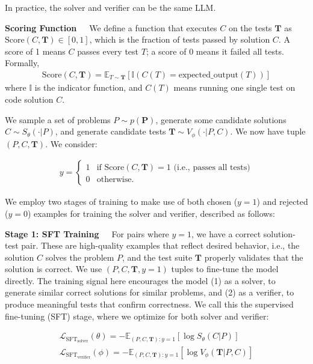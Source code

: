 In practice, the solver and verifier can be the same LLM.

\textbf{Scoring Function}\ \ \ We define a function that executes $C$ on the tests $\mathbf{T}$ as $\text{Score}(C, \mathbf{T}) \in [0, 1]$, which is the fraction of tests passed by solution $C$. A score of 1 means $C$ passes every test $T$; a score of 0 means it failed all tests. Formally,
\begin{align}
    \text{Score}(C, \mathbf{T}) = \mathbb{E}_{T\sim \mathbf{T}}[\mathbb{I}(C(T)=\text{expected\_output}(T))]
\end{align}
where $\mathbb{I}$ is the indicator function, and $C(T)$ means running one single test on code solution $C$.

We sample a set of problems $P \sim p(\mathbf{P})$, generate some candidate solutions $C \sim S_{\theta}(\cdot | P)$, and generate candidate tests $\mathbf{T} \sim V_{\phi}(\cdot | P, C)$. We now have tuple $(P, C, \mathbf{T})$. We consider:

\begin{align}
y = \begin{cases}
1 & \text{if } \text{Score}(C,\mathbf{T}) = 1 \text{ (i.e., passes all tests)} \\
0 & \text{otherwise}.
\end{cases}
\end{align}

We employ two stages of  training to make use of both chosen ($y=1$) and rejected ($y=0$) examples for training the solver and verifier, described as follows:

\textbf{Stage 1: SFT Training}\ \ \ For pairs where $y = 1$, we have a correct solution-test pair. These are high-quality examples that reflect desired behavior, i.e., the solution $C$ solves the problem $P$, and the test suite $\mathbf{T}$ properly validates that the solution is correct. We use $(P, C, \mathbf{T}, y = 1)$ tuples to fine-tune the model directly. The training signal here encourages the model (1) as a solver, to generate similar correct solutions for similar problems, and (2) as a verifier, to produce meaningful tests that confirm correctness. We call this the supervised fine-tuning (SFT) stage, where we optimize for both solver and verifier:

\begin{align}
    \mathcal{L}_{\text{SFT}_\text{solver}}(\theta) = -\mathbb{E}_{(P, C, \mathbf{T}):y=1}[\log S_{\theta}(C|P)] \\
    \mathcal{L}_{\text{SFT}_\text{verifier}}(\phi) = -\mathbb{E}_{(P, C, \mathbf{T}):y=1}[\log V_{\phi}(\mathbf{T}|P, C)]
\end{align}

